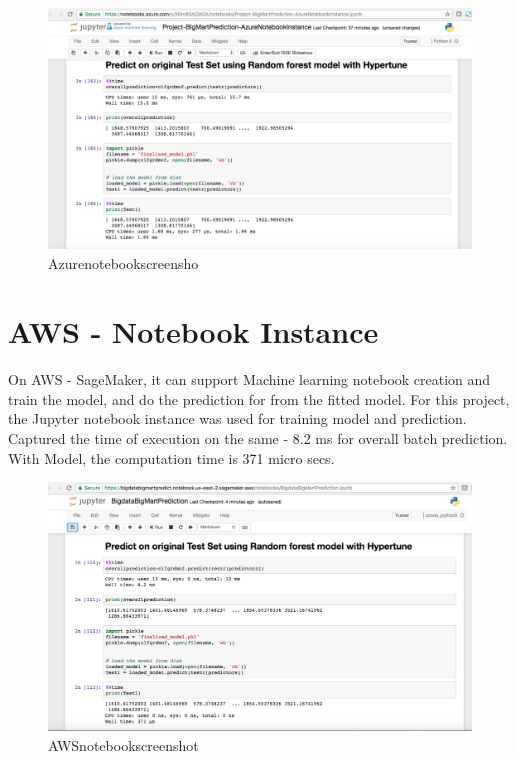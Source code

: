 \begin{figure}[pic9]
	\centering\includegraphics[width=\columnwidth]{Images/Azurenotebookscreenshot.png}
	\caption{Azurenotebookscreensho}\label{fig:Azurenotebookscreensho}
\end{figure}

\section{AWS - Notebook Instance}

On AWS - SageMaker, it can support Machine learning notebook creation and train the model,
and do the prediction for from the fitted model. For this project, the Jupyter notebook instance was
used for training model and prediction.
Captured the time of execution on the same - 8.2 ms for overall batch prediction.
With Model, the computation time is 371 micro secs.

\begin{figure}[pic10]
	\centering\includegraphics[width=\columnwidth]{Images/AWSnotebookscreenshot.png}
	\caption{AWSnotebookscreenshot}\label{fig:AWSnotebookscreenshot}
\end{figure}

